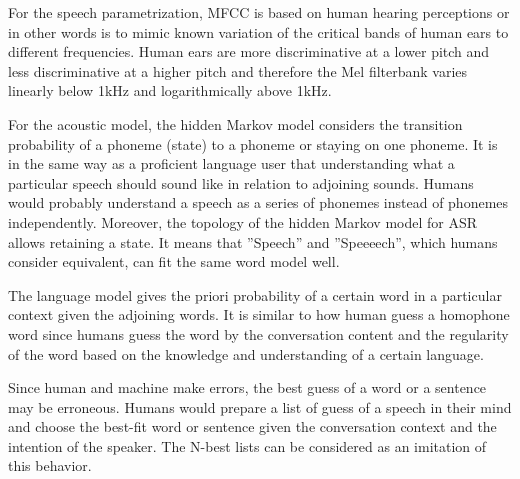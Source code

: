 \documentclass[12pt]{article}
\newenvironment{problem}[2][Problem]{\begin{trivlist}
\item[\hskip \labelsep {\bfseries #1}\hskip \labelsep {\bfseries #2.}]}{\end{trivlist}}
\begin{document}
\begin{problem}{1.2}
    For the speech parametrization, MFCC is based on human hearing perceptions 
    or in other words is to mimic known variation of the critical bands of human 
    ears to different frequencies. 
    Human ears are more discriminative at a lower pitch and less discriminative 
    at a higher pitch and therefore the Mel filterbank varies linearly below 1kHz
    and logarithmically above 1kHz.

    For the acoustic model, the hidden Markov model considers the transition 
    probability of a phoneme (state) to a phoneme or staying on one phoneme. 
    It is in the same way as a proficient language user that understanding what
    a particular speech should sound like in relation to adjoining sounds. 
    Humans would probably understand a speech as a series of phonemes instead of 
    phonemes independently. Moreover, the topology of the hidden Markov model 
    for ASR allows retaining a state. 
    It means that ”Speech” and ”Speeeech”, which humans consider equivalent, 
    can fit the same word model well. 

    The language model gives the priori probability of a certain word in a 
    particular context given the adjoining words. 
    It is similar to how human guess a homophone word since humans guess 
    the word by the conversation content and the regularity of the word based on
    the knowledge and understanding of a certain language. 
    
    Since human and machine make errors, the best guess of a word or a sentence 
    may be erroneous. 
    Humans would prepare a list of guess of a speech in their mind and choose 
    the best-fit word or sentence given the conversation context and the intention 
    of the speaker.
    The N-best lists can be considered as an imitation of this behavior.
\end{problem}
\end{document}
